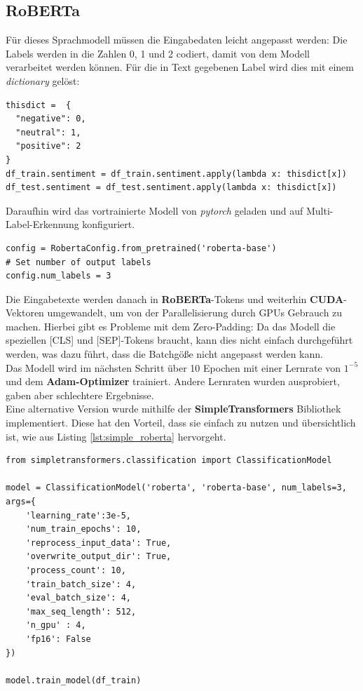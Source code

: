 \subsection{RoBERTa}
F\"ur dieses Sprachmodell m\"ussen die Eingabedaten leicht angepasst werden: Die Labels werden in die Zahlen 0, 1 und 2 codiert, damit von dem Modell verarbeitet werden k\"onnen. F\"ur die in Text gegebenen Label wird dies mit einem \textit{dictionary} gel\"ost:
\lstset{language=Python}
\lstset{frame=lines}
\lstset{captionpos=b}
\lstset{basicstyle=\footnotesize}
\begin{lstlisting}
thisdict =	{
  "negative": 0,
  "neutral": 1,
  "positive": 2
}
df_train.sentiment = df_train.sentiment.apply(lambda x: thisdict[x])
df_test.sentiment = df_test.sentiment.apply(lambda x: thisdict[x])
\end{lstlisting}
Daraufhin wird das vortrainierte Modell von \textit{pytorch} geladen und auf Multi-Label-Erkennung konfiguriert.
\lstset{language=Python}
\lstset{frame=lines}
\lstset{captionpos=b}
\lstset{basicstyle=\footnotesize}
\begin{lstlisting}
config = RobertaConfig.from_pretrained('roberta-base')
# Set number of output labels
config.num_labels = 3
\end{lstlisting}
Die Eingabetexte werden danach in \textbf{RoBERTa}-Tokens und weiterhin \textbf{CUDA}-Vektoren umgewandelt, um von der Parallelisierung durch GPUs Gebrauch zu machen. Hierbei gibt es Probleme mit dem Zero-Padding: Da das Modell die speziellen [CLS] und [SEP]-Tokens braucht, kann dies nicht einfach durchgef\"uhrt werden, was dazu f\"uhrt, dass die Batchg\"o{\ss}e nicht angepasst werden kann. \\
Das Modell wird im n\"achsten Schritt \"uber 10 Epochen mit einer Lernrate von $1^{-5}$ und dem \textbf{Adam-Optimizer} trainiert. Andere Lernraten wurden ausprobiert, gaben aber schlechtere Ergebnisse.\\
Eine alternative Version wurde mithilfe der \textbf{SimpleTransformers} Bibliothek implementiert. Diese hat den Vorteil, dass sie einfach zu nutzen und \"ubersichtlich ist, wie aus Listing \ref{lst:simple_roberta} hervorgeht.
\lstset{language=Python}
\lstset{frame=lines}
\lstset{captionpos=b}
\lstset{basicstyle=\footnotesize}
\begin{lstlisting}
from simpletransformers.classification import ClassificationModel

model = ClassificationModel('roberta', 'roberta-base', num_labels=3, args={
    'learning_rate':3e-5,
    'num_train_epochs': 10,
    'reprocess_input_data': True,
    'overwrite_output_dir': True,
    'process_count': 10,
    'train_batch_size': 4,
    'eval_batch_size': 4,
    'max_seq_length': 512,
    'n_gpu' : 4,
    'fp16': False
})

model.train_model(df_train)
\end{lstlisting}

